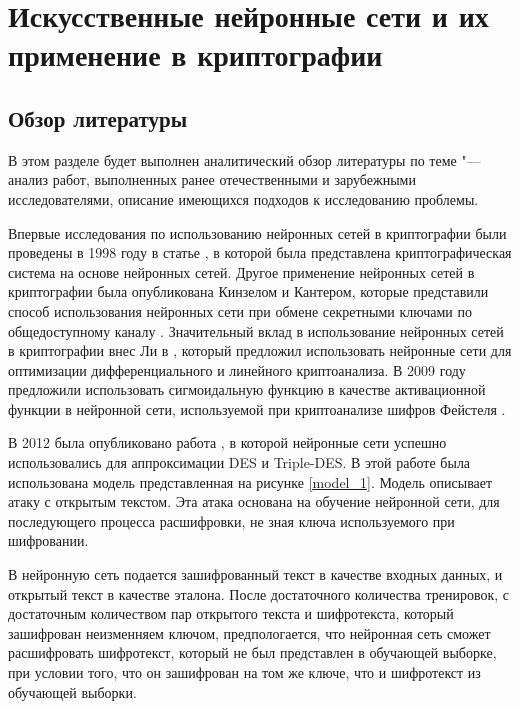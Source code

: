 \chapter{Искусственные нейронные сети и их применение в криптографии}
\label{c:}
\section{Обзор литературы}
В этом разделе будет выполнен аналитический обзор литературы по теме "--- анализ работ, выполненных ранее отечественными и зарубежными исследователями, описание имеющихся подходов к исследованию проблемы.
\bigskip

Впервые исследования по использованию нейронных сетей в криптографии были проведены в 1998 году в статье \cite{clark},
в которой была представлена криптографическая система на основе нейронных сетей. Другое применение нейронных сетей в криптографии
была опубликована Кинзелом и Кантером, которые представили способ использования нейронных
сети при обмене секретными ключами по общедоступному каналу \cite{kinzel}. Значительный вклад в использование нейронных сетей в криптографии
внес Ли в \cite{lis}, который предложил использовать нейронные сети для оптимизации дифференциального
и линейного криптоанализа. В 2009 году предложили использовать сигмоидальную функцию в качестве активационной функции в нейронной сети,
используемой при криптоанализе шифров Фейстеля \cite{rao}.
\bigskip

В 2012 была опубликовано работа \cite{neuro_des}, в которой нейронные сети успешно использовались для аппроксимации DES и Triple-DES.
В этой работе была использована модель представленная на рисунке \ref{model_1}.
Модель описывает атаку с открытым текстом. Эта атака основана на обучение нейронной сети, для последующего процесса расшифровки, не зная ключа используемого при шифровании.
\bigskip

В нейронную сеть подается зашифрованный текст в качестве входных данных, и открытый текст в качестве эталона.
После достаточного количества тренировок, с достаточным количеством пар открытого текста и шифротекста, который зашифрован неизменняем ключом,
предпологается, что нейронная сеть сможет расшифровать шифротекст, который не был представлен в обучающей выборке, при условии того, что он зашифрован на том же ключе, что и шифротекст из обучающей выборки.


